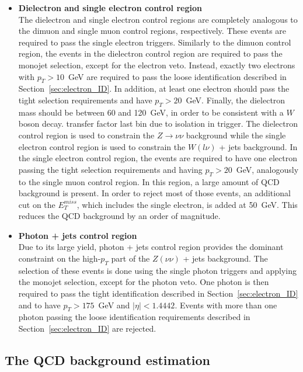 \begin{itemize}
\item[] \textbf{Dielectron and single electron control region}\\ The dielectron and single electron control regions are completely analogous to the dimuon and single muon control regions, respectively. These events are required to pass the single electron triggers. Similarly to the dimuon control region, the events in the dielectron control region are required to pass the monojet selection, except for the electron veto. Instead, exactly two electrons with $p_T > 10$~GeV are required to pass the loose identification described in Section~\ref{sec:electron_ID}. In addition, at least one electron should pass the tight selection requirements and have $p_T > 20$~GeV. Finally, the dielectron mass should be between 60 and 120~GeV, in order to be consistent with a $W$ boson decay. {\color{red}transfer factor last bin due to isolation in trigger}. The dielectron control region is used to constrain the $Z\rightarrow\nu\nu$ background while the single electron control region is used to constrain the $W(l\nu)$ + jets background. In the single electron control region, the events are required to have one electron passing the tight selection requirements and having $p_T > 20$~GeV, analogously to the single muon control region. In this region, a large amount of QCD background is present. In order to reject most of those events, an additional cut on the $E_T^{miss}$, which includes the single electron, is added at 50~GeV. This reduces the QCD background by an order of magnitude.

\item[] \textbf{Photon + jets control region}\\Due to its large yield, photon + jets control region provides the dominant constraint on the high-$p_T$ part of the $Z(\nu\nu)$ + jets background. The selection of these events is done using the single photon triggers and applying the monojet selection, except for the photon veto. One photon is then required to pass the tight identification described in Section~\ref{sec:electron_ID} and to have $p_T > 175$~GeV and $|\eta| < 1.4442$. Events with more than one photon passing the loose identification requirements described in Section~\ref{sec:electron_ID} are rejected.
\end{itemize}

\subsection{The QCD background estimation}

